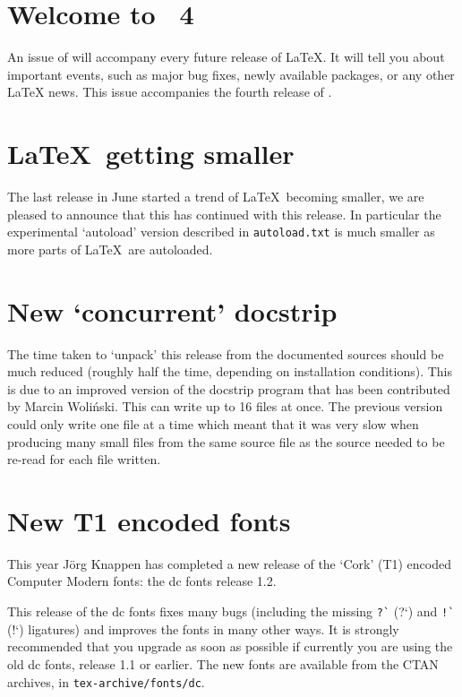 \documentclass{ltnews}
\providecommand\file[1]{\texttt{#1}}
\begin{document}
\maketitle

\section{Welcome to \LaTeXNews~4}

An  issue of \emph{\LaTeXNews} will accompany every future release of
\LaTeX.  It will tell you about important events, such as major bug
fixes, newly available packages, or any other \LaTeX{} news.
This issue accompanies the fourth release of \LaTeXe.


\section{\LaTeX\ getting smaller}

The last release in June started a trend of \LaTeX\ becoming
smaller, we are pleased to announce that this has continued with this
release. In particular the experimental `autoload' version described in
\file{autoload.txt} is much smaller as more parts of \LaTeX\ are
autoloaded.

\section{New `concurrent' docstrip}

The time taken to `unpack' this release from the documented sources
should be much reduced (roughly half the time, depending on
installation conditions). This is due to an improved version of the
docstrip program that has been contributed by Marcin Woli\'nski.
This can write up to 16 files at once. The
previous version could only write one file at a time which meant that
it was very slow when producing many small files from the same source
file as the source needed to be re-read for each file written.

\section{New T1 encoded fonts}

This year J\"org Knappen has completed a new release of the `Cork'
(T1) encoded Computer Modern fonts: the dc fonts release 1.2.

This release of the dc fonts fixes many bugs (including the missing
\verb|?`| (?`) and \verb|!`| (!`) ligatures) and improves the fonts in
many other ways. It is strongly recommended that you upgrade as soon as
possible if currently you are using the old dc fonts, release 1.1 or
earlier. The new fonts are available from the CTAN archives, in
\file{tex-archive/fonts/dc}.
\end{document}

